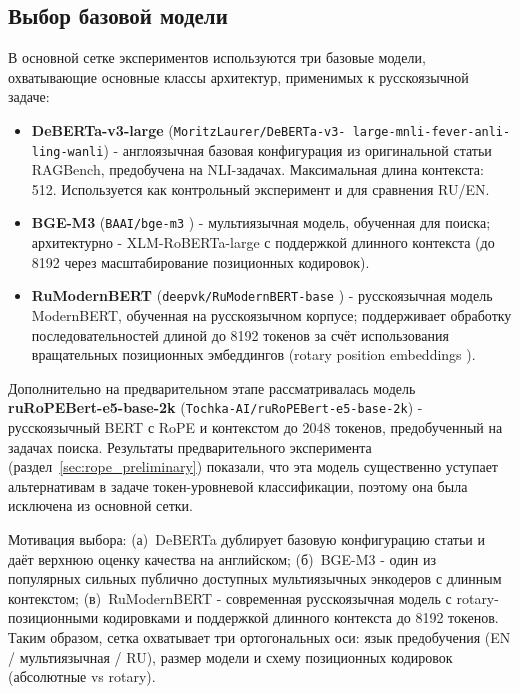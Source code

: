 \subsection{Выбор базовой модели}
\label{sec:backbones}

В основной сетке экспериментов используются три базовые модели, охватывающие основные классы архитектур, применимых к русскоязычной задаче:

\begin{itemize}
  \item \textbf{DeBERTa-v3-large} (\texttt{MoritzLaurer/DeBERTa-v3-
  large-mnli-fever-anli-ling-wanli}) - англоязычная базовая конфигурация из оригинальной
  статьи RAGBench, предобучена на NLI-задачах. Максимальная длина контекста: 512.
   Используется как контрольный эксперимент и для сравнения RU/EN.
  \item \textbf{BGE-M3} (\texttt{BAAI/bge-m3} \cite{bge-m3} ) - мультиязычная модель,
  обученная для поиска; архитектурно - XLM-RoBERTa-large с поддержкой длинного контекста
   (до 8192 через масштабирование позиционных кодировок).
  \item \textbf{RuModernBERT} (\texttt{deepvk/RuModernBERT-base} \cite{deepvk2025rumodernbert})
     - русскоязычная модель ModernBERT, обученная на русскоязычном корпусе;
     поддерживает обработку последовательностей длиной до 8192 токенов за счёт использования
     вращательных позиционных эмбеддингов (rotary position embeddings \cite{su2024roformer}).
\end{itemize}

Дополнительно на предварительном этапе рассматривалась модель \textbf{ruRoPEBert-e5-base-2k}
 (\texttt{Tochka-AI/ruRoPEBert-e5-base-2k}) - русскоязычный BERT с RoPE и контекстом до 2048
  токенов, предобученный на задачах поиска. Результаты предварительного эксперимента
   (раздел~\ref{sec:rope_preliminary}) показали, что эта модель существенно уступает
    альтернативам в задаче токен-уровневой классификации, поэтому она была исключена из
    основной сетки.

Мотивация выбора: (а)~DeBERTa дублирует базовую конфигурацию статьи и даёт
верхнюю оценку качества на английском; (б)~BGE-M3 - один из популярных сильных
публично доступных мультиязычных энкодеров с длинным контекстом;
(в)~RuModernBERT - современная русскоязычная модель с rotary-позиционными
 кодировками и поддержкой длинного контекста до 8192 токенов. Таким образом, сетка охватывает три
 ортогональных оси: язык предобучения (EN / мультиязычная / RU), размер модели и схему
  позиционных кодировок (абсолютные vs rotary).

